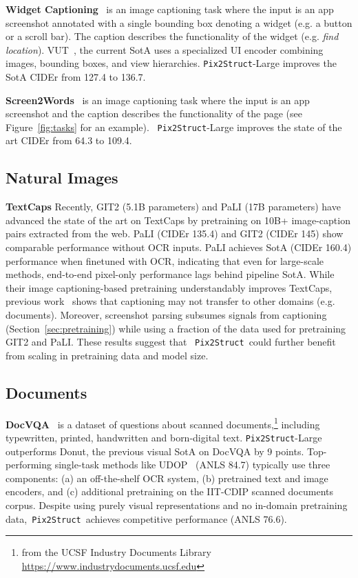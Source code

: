 \documentclass{article} %
\newcommand\ourmodel{{\texttt{Pix2Struct}}}
\begin{document}
\textbf{Widget Captioning}~\citep{li-etal-2020-widget} is an image captioning task where the input is an app screenshot annotated with a single bounding box denoting a widget (e.g. a button or a scroll bar). The caption describes the functionality of the widget (e.g. \emph{find location}).
VUT~\citep{li2021vut}, the current SotA uses a specialized UI encoder combining images, bounding boxes, and view hierarchies. \ourmodel-Large improves the SotA CIDEr from 127.4 to 136.7.

\textbf{Screen2Words}~\citep{screen2words} is an image captioning task where the input is an app screenshot and the caption describes the functionality of the page (see Figure~\ref{fig:tasks} for an example).
~\ourmodel-Large improves the state of the art CIDEr from 64.3 to 109.4.

\subsection{Natural Images}
\textbf{TextCaps}
Recently, GIT2 (5.1B parameters) and PaLI (17B parameters) have advanced the state of the art on TextCaps by pretraining on 10B+ image-caption pairs extracted from the web.
PaLI (CIDEr 135.4) and GIT2 (CIDEr 145) show comparable performance without OCR inputs. PaLI achieves SotA (CIDEr 160.4) performance when finetuned with OCR, indicating that even for large-scale methods, end-to-end pixel-only performance lags behind pipeline SotA. While their image captioning-based pretraining understandably improves TextCaps, previous work~\citep{donut} shows that captioning may not transfer to other domains (e.g. documents). Moreover, screenshot parsing subsumes signals from  captioning (Section~\ref{sec:pretraining}) while using a fraction of the data used for pretraining GIT2 and PaLI. These results suggest that ~\ourmodel~could further benefit from scaling in pretraining data and model size.

\subsection{Documents}

\textbf{DocVQA}~\citep{mathew2021docvqa} is a dataset of questions about scanned documents,\footnote{from the UCSF Industry Documents Library \url{https://www.industrydocuments.ucsf.edu}} including typewritten, printed, handwritten and born-digital text.
\ourmodel-Large outperforms Donut, the previous visual SotA on DocVQA by 9 points. Top-performing single-task methods like 
UDOP~\citep{tang2022unifying} (ANLS 84.7)
typically use three components: (a) an off-the-shelf OCR system, (b) pretrained text and image encoders, and (c) additional pretraining on the IIT-CDIP scanned documents corpus. Despite using purely visual representations and no in-domain pretraining data,~\ourmodel~achieves competitive performance (ANLS 76.6). 
\end{document}
